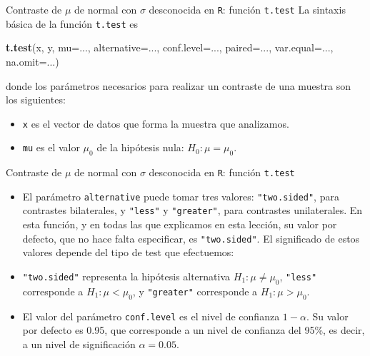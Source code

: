 \documentclass[
  ignorenonframetext,
]{beamer}
\newenvironment{Shaded}{\begin{snugshade}}{\end{snugshade}}
\newcommand{\DataTypeTok}[1]{\textcolor[rgb]{0.13,0.29,0.53}{#1}}
\newcommand{\KeywordTok}[1]{\textcolor[rgb]{0.13,0.29,0.53}{\textbf{#1}}}
\newcommand{\NormalTok}[1]{#1}
\begin{document}
\begin{frame}[fragile]{Contraste de \(\mu\) de normal con \(\sigma\)
desconocida en \texttt{R}: función \texttt{t.test}}
\protect\hypertarget{contraste-de-mu-de-normal-con-sigma-desconocida-en-r-funciuxf3n-t.test}{}
La sintaxis básica de la función \texttt{t.test} es

\begin{Shaded}
\begin{Highlighting}[]
\KeywordTok{t.test}\NormalTok{(x, y, }\DataTypeTok{mu=}\NormalTok{..., }\DataTypeTok{alternative=}\NormalTok{..., }\DataTypeTok{conf.level=}\NormalTok{..., }\DataTypeTok{paired=}\NormalTok{..., }
       \DataTypeTok{var.equal=}\NormalTok{..., }\DataTypeTok{na.omit=}\NormalTok{...)}
\end{Highlighting}
\end{Shaded}

donde los parámetros necesarios para realizar un contraste de una
muestra son los siguientes:

\begin{itemize}[<+->]
\item
  \texttt{x} es el vector de datos que forma la muestra que analizamos.
\item
  \texttt{mu} es el valor \(\mu_0\) de la hipótesis nula:
  \(H_0: \mu=\mu_0\).
\end{itemize}
\end{frame}

\begin{frame}[fragile]{Contraste de \(\mu\) de normal con \(\sigma\)
desconocida en \texttt{R}: función \texttt{t.test}}
\protect\hypertarget{contraste-de-mu-de-normal-con-sigma-desconocida-en-r-funciuxf3n-t.test-1}{}
\begin{itemize}[<+->]
\item
  El parámetro \texttt{alternative} puede tomar tres valores:
  \texttt{"two.sided"}, para contrastes bilaterales, y \texttt{"less"} y
  \texttt{"greater"}, para contrastes unilaterales. En esta función, y
  en todas las que explicamos en esta lección, su valor por defecto, que
  no hace falta especificar, es \texttt{"two.sided"}. El significado de
  estos valores depende del tipo de test que efectuemos:
\item
  \texttt{"two.sided"} representa la hipótesis alternativa
  \(H_1: \mu\neq \mu_0\), \texttt{"less"} corresponde a
  \(H_1: \mu< \mu_0\), y \texttt{"greater"} corresponde a
  \(H_1: \mu> \mu_0\).
\item
  El valor del parámetro \texttt{conf.level} es el nivel de confianza
  \(1-\alpha\). Su valor por defecto es 0.95, que corresponde a un nivel
  de confianza del 95\%, es decir, a un nivel de significación
  \(\alpha=0.05\).
\end{itemize}
\end{frame}
\end{document}
